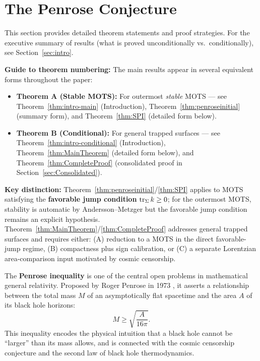 \section{The Penrose Conjecture}
\label{sec:penrose_conjecture}

\begin{remark}
This section provides detailed theorem statements and proof strategies. For the executive summary of results (what is proved unconditionally vs.\ conditionally), see Section~\ref{sec:intro}.

\textbf{Guide to theorem numbering:} The main results appear in several equivalent forms throughout the paper:
\begin{itemize}
    \item \textbf{Theorem A (Stable MOTS):} For outermost \emph{stable} MOTS --- see Theorem~\ref{thm:intro-main} (Introduction), Theorem~\ref{thm:penroseinitial} (summary form), and Theorem~\ref{thm:SPI} (detailed form below).
    \item \textbf{Theorem B (Conditional):} For general trapped surfaces --- see Theorem~\ref{thm:intro-conditional} (Introduction), Theorem~\ref{thm:MainTheorem} (detailed form below), and Theorem~\ref{thm:CompleteProof} (consolidated proof in Section~\ref{sec:Consolidated}).
\end{itemize}
\textbf{Key distinction:} Theorem~\ref{thm:penroseinitial}/\ref{thm:SPI} applies to MOTS satisfying the \textbf{favorable jump condition} $\operatorname{tr}_\Sigma k \ge 0$; for the outermost MOTS, stability is automatic by Andersson--Metzger but the favorable jump condition remains an explicit hypothesis. Theorem~\ref{thm:MainTheorem}/\ref{thm:CompleteProof} addresses general trapped surfaces and requires either: (A) reduction to a MOTS in the direct favorable-jump regime, (B) compactness plus sign calibration, or (C) a separate Lorentzian area-comparison input motivated by cosmic censorship.
\end{remark}

The \textbf{Penrose inequality} is one of the central open problems in mathematical general relativity. Proposed by Roger Penrose in 1973 \cite{penrose1973}, it asserts a relationship between the total mass $M$ of an asymptotically flat spacetime and the area $A$ of its black hole horizons:
\begin{equation}\label{eq:PenroseConjectureIntro}
    M \ge \sqrt{\frac{A}{16\pi}}.
\end{equation}
This inequality encodes the physical intuition that a black hole cannot be ``larger'' than its mass allows, and is connected with the cosmic censorship conjecture and the second law of black hole thermodynamics.

